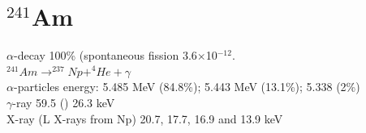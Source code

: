 \documentclass[a4paper, 11 pt]{report}
\begin{document}










\clearpage

\appendix
\section{$^{241}$Am}
$\alpha$-decay 100\%    (spontaneous fission 3.6$\times$10$^{-12}$.\\
$ ^{241}Am\rightarrow^{237}Np+^4He+\gamma$\\
$\alpha$-particles energy: 5.485 MeV (84.8\%); 5.443 MeV (13.1\%); 5.338 (2\%)\\
$\gamma$-ray 59.5 () 26.3 keV\\
X-ray (L  X-rays  from  Np) 20.7,  17.7,  16.9  and  13.9  keV\\
\end{document}
